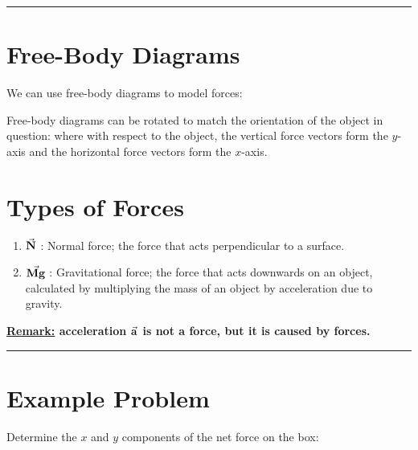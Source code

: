 \documentclass{article}
\begin{document}
\hrule
\section{Free-Body Diagrams}
We can use free-body diagrams to model forces:
\begin{multicols}{2}
\begin{figure}[H]
    \centering
\end{figure}

\columnbreak
\noindent Free-body diagrams can be rotated to match the orientation of the object in question:
where with respect to the object, the vertical force vectors form the $y$-axis and the 
horizontal force vectors form the $x$-axis.
\end{multicols}

\section{Types of Forces}
\begin{enumerate}
    \item $\va{N}$ : Normal force; the force that acts perpendicular to a surface.
    \item $\va{Mg}$ : Gravitational force; the force that acts downwards on an object,
    calculated by multiplying the mass of an object by acceleration due to gravity.
\end{enumerate}
\textbf{\underline{Remark:} acceleration $\va{a}$ is not a force, but it is caused by forces.}
\vspace{1em}

\hrule
\section{Example Problem}

Determine the $x$ and $y$ components of the net force on the box:
\begin{figure}[H]
\end{figure}
\end{document}

